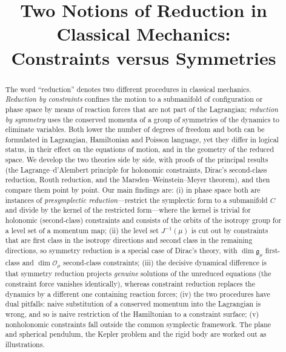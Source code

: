 \documentclass[11pt,a4paper]{article}
\title{\textbf{Two Notions of Reduction in Classical Mechanics:\\[2pt] Constraints versus Symmetries}}
\author{}
\date{}
\numberwithin{equation}{section}
\theoremstyle{plain}
\theoremstyle{definition}
\theoremstyle{remark}
\newcommand{\frakg}{\mathfrak{g}}
\begin{document}
\maketitle

\begin{abstract}
The word ``reduction'' denotes two different procedures in classical mechanics.
\emph{Reduction by constraints} confines the motion to a submanifold of configuration or phase space by means of reaction forces that are not part of the Lagrangian;
\emph{reduction by symmetry} uses the conserved momenta of a group of symmetries of the dynamics to eliminate variables.
Both lower the number of degrees of freedom and both can be formulated in Lagrangian, Hamiltonian and Poisson language, yet they differ in logical status, in their effect on the equations of motion, and in the geometry of the reduced space.
We develop the two theories side by side, with proofs of the principal results (the Lagrange--d'Alembert principle for holonomic constraints, Dirac's second-class reduction, Routh reduction, and the Marsden--Weinstein--Meyer theorem), and then compare them point by point.
Our main findings are:
(i) in phase space both are instances of \emph{presymplectic reduction}---restrict the symplectic form to a submanifold $C$ and divide by the kernel of the restricted form---where the kernel is trivial for holonomic (second-class) constraints and consists of the orbits of the isotropy group for a level set of a momentum map;
(ii) the level set $J^{-1}(\mu)$ is cut out by constraints that are first class in the isotropy directions and second class in the remaining directions, so symmetry reduction is a special case of Dirac's theory, with $\dim\frakg_\mu$ first-class and $\dim\mathcal O_\mu$ second-class constraints;
(iii) the decisive dynamical difference is that symmetry reduction projects \emph{genuine} solutions of the unreduced equations (the constraint force vanishes identically), whereas constraint reduction replaces the dynamics by a different one containing reaction forces;
(iv) the two procedures have dual pitfalls: naive substitution of a conserved momentum into the Lagrangian is wrong, and so is naive restriction of the Hamiltonian to a constraint surface;
(v) nonholonomic constraints fall outside the common symplectic framework.
The plane and spherical pendulum, the Kepler problem and the rigid body are worked out as illustrations.
\end{abstract}

\tableofcontents

\end{document}
